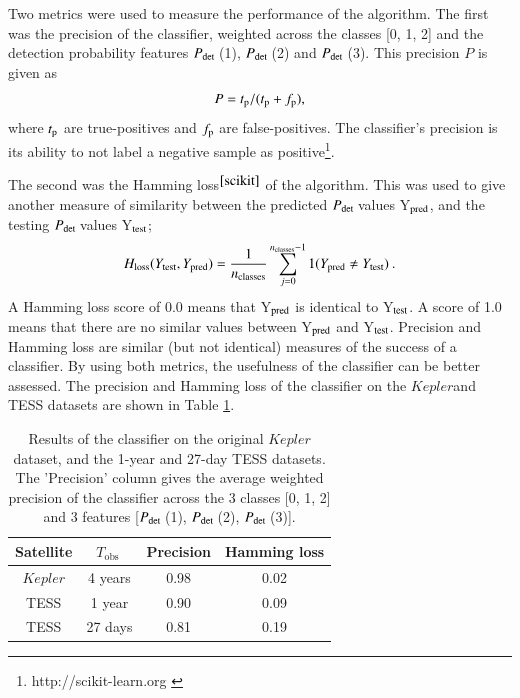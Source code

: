 \documentclass[a4paper,fleqn,usenatbib,useAMS]{mnras}
\newcommand{\kep}{\ensuremath{Kepler}\:}
\newcommand{\pdet}{\ensuremath{P_{\rm det}\:}}
\newcommand{\tobs}{\ensuremath{T_{\textrm{obs}}\:}}
\begin{document}
Two metrics were used to measure the performance of the algorithm. The first was the precision of the classifier, weighted across the classes [0, 1, 2] and the detection probability features \pdet(1), \pdet(2) and \pdet(3). This precision $P$ is given as
\begin{equation}
P = t_{\rm p} / (t_{\rm p} + f_{\rm p}), 
\end{equation}
where $t_{\rm p}$ are true-positives and $f_{\rm p}$ are false-positives. The classifier's precision is its ability to not label a negative sample as positive\footnote{http://scikit-learn.org \label{scikit}}.

The second was the Hamming loss$^{\ref{scikit}}$
\citep{wegner_technique_1960} of the algorithm. This was used to give another measure of similarity between the predicted \pdet values Y$_{\rm pred}$, and the testing \pdet values Y$_{\rm test}$;
\begin{equation}
H_{\rm loss}(Y_{\rm test}, Y_{\rm pred}) = \frac{1}{n_{\rm classes}} \sum_{j=0}^{n_{\rm classes}-1} 1(Y_{\rm pred} \neq Y_{\rm test}) \: . 
\end{equation}
A Hamming loss score of 0.0 means that Y$_{\rm pred}$ is identical to Y$_{\rm test}$. A score of 1.0 means that there are no similar values between Y$_{\rm pred}$ and Y$_{\rm test}$. Precision and Hamming loss are similar (but not identical) measures of the success of a classifier. By using both metrics, the usefulness of the classifier can be better assessed. The precision and Hamming loss of the classifier on the \kep and TESS datasets are shown in Table \ref{tab: results}.
\begin{table}
\begin{center}
\begin{tabular}{ |c|c|c|c| }
Satellite & \tobs   & Precision & Hamming loss \\
\hline
\kep      & 4 years & 0.98      & 0.02         \\
TESS      & 1 year  & 0.90      & 0.09         \\
TESS      & 27 days & 0.81      & 0.19         \\
\end{tabular}
\end{center}
\caption{Results of the classifier on the original \kep dataset, and the 1-year and 27-day TESS datasets. The 'Precision' column gives the average weighted precision of the classifier across the 3 classes [0, 1, 2] and 3 features [\pdet(1), \pdet(2), \pdet(3)].}
\label{tab: results}
\end{table}
\end{document}
